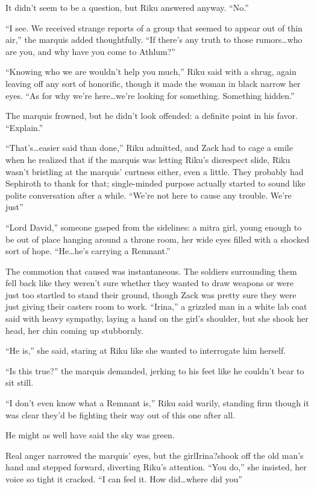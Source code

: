 It didn't seem to be a question, but Riku answered anyway. ``No.''

``I see. We received strange reports of a group that seemed to appear out of thin air,'' the marquis added thoughtfully. ``If there's any truth to those rumors\ldots who are you, and why have you come to Athlum?''

``Knowing who we are wouldn't help you much,'' Riku said with a shrug, again leaving off any sort of honorific, though it made the woman in black narrow her eyes. ``As for why we're here\ldots we're looking for something. Something hidden.''

The marquis frowned, but he didn't look offended: a definite point in his favor. ``Explain.''

``That's\ldots easier said than done,'' Riku admitted, and Zack had to cage a smile when he realized that if the marquis was letting Riku's disrespect slide, Riku wasn't bristling at the marquis' curtness either, even a little. They probably had Sephiroth to thank for that; single-minded purpose actually started to sound like polite conversation after a while. ``We're not here to cause any trouble. We're just\textemdash''

``Lord David,'' someone gasped from the sidelines: a mitra girl, young enough to be out of place hanging around a throne room, her wide eyes filled with a shocked sort of hope. ``He\ldots he's carrying a Remnant.''

The commotion that caused was instantaneous. The soldiers surrounding them fell back like they weren't sure whether they wanted to draw weapons or were just too startled to stand their ground, though Zack was pretty sure they were just giving their casters room to work. ``Irina,'' a grizzled man in a white lab coat said with heavy sympathy, laying a hand on the girl's shoulder, but she shook her head, her chin coming up stubbornly.

``He is,'' she said, staring at Riku like she wanted to interrogate him herself.

``Is this true?'' the marquis demanded, jerking to his feet like he couldn't bear to sit still.

``I don't even know what a Remnant is,'' Riku said warily, standing firm though it was clear they'd be fighting their way out of this one after all.

He might as well have said the sky was green.

Real anger narrowed the marquis' eyes, but the girl\textemdash Irina?\textemdash shook off the old man's hand and stepped forward, diverting Riku's attention. ``You do,'' she insisted, her voice so tight it cracked. ``I can feel it. How did\ldots where did you\textemdash''

